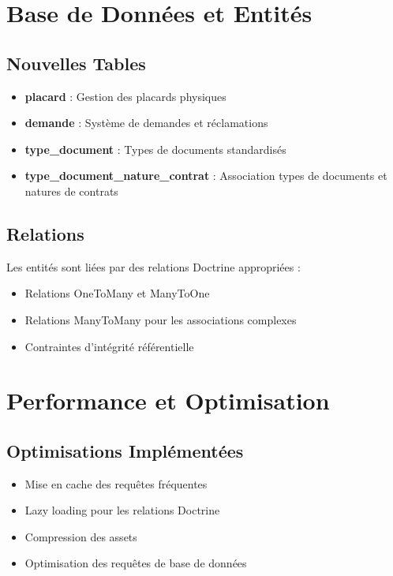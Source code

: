 \documentclass[12pt,a4paper]{article}
\begin{document}
\section{Base de Données et Entités}

\subsection{Nouvelles Tables}
\begin{itemize}
    \item \textbf{placard} : Gestion des placards physiques
    \item \textbf{demande} : Système de demandes et réclamations
    \item \textbf{type\_document} : Types de documents standardisés
    \item \textbf{type\_document\_nature\_contrat} : Association types de documents et natures de contrats
\end{itemize}

\subsection{Relations}
Les entités sont liées par des relations Doctrine appropriées :
\begin{itemize}
    \item Relations OneToMany et ManyToOne
    \item Relations ManyToMany pour les associations complexes
    \item Contraintes d'intégrité référentielle
\end{itemize}

\section{Performance et Optimisation}

\subsection{Optimisations Implémentées}
\begin{itemize}
    \item Mise en cache des requêtes fréquentes
    \item Lazy loading pour les relations Doctrine
    \item Compression des assets
    \item Optimisation des requêtes de base de données
\end{itemize}
\end{document}
